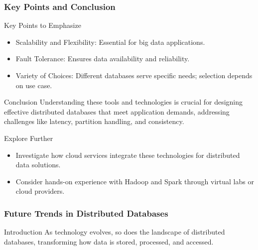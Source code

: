 \documentclass[aspectratio=169]{beamer}
\begin{document}
\begin{frame}[fragile]
    \frametitle{Key Points and Conclusion}
    \begin{block}{Key Points to Emphasize}
        \begin{itemize}
            \item Scalability and Flexibility: Essential for big data applications.
            \item Fault Tolerance: Ensures data availability and reliability.
            \item Variety of Choices: Different databases serve specific needs; selection depends on use case.
        \end{itemize}
    \end{block}

    \begin{block}{Conclusion}
        Understanding these tools and technologies is crucial for designing effective distributed databases that meet application demands, addressing challenges like latency, partition handling, and consistency.
    \end{block}

    \begin{block}{Explore Further}
        \begin{itemize}
            \item Investigate how cloud services integrate these technologies for distributed data solutions.
            \item Consider hands-on experience with Hadoop and Spark through virtual labs or cloud providers.
        \end{itemize}
    \end{block}
\end{frame}

\begin{frame}[fragile]
    \frametitle{Future Trends in Distributed Databases}
    \begin{block}{Introduction}
        As technology evolves, so does the landscape of distributed databases, transforming how data is stored, processed, and accessed.
    \end{block}
\end{frame}
\end{document}
